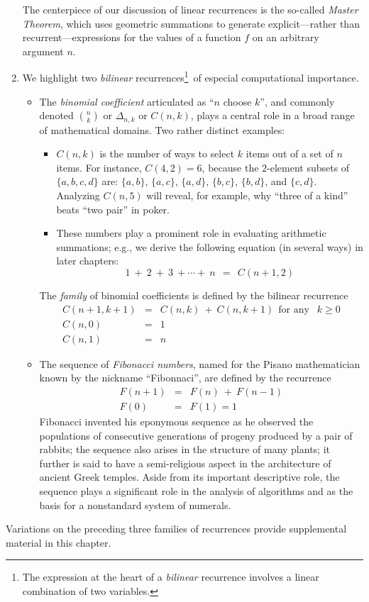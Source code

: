 \begin{enumerate}
\smallskip

The centerpiece of our discussion of linear recurrences is the so-called {\em Master Theorem}, which uses geometric summations to generate explicit---rather than recurrent---expressions for the values of a function $f$ on an arbitrary argument $n$.

\item
We highlight two {\it bilinear} recurrences\footnote{The expression at the heart of a {\it bilinear} recurrence involves a linear combination of two variables.}~of especial computational importance. 
  \begin{itemize} 
  \item
The {\it binomial coefficient} articulated as ``$n$ choose $k$'', and commonly denoted $\displaystyle {n \choose k}$ or $\Delta_{n,k}$ or $C(n,k)$, plays a central role in a broad range of mathematical domains.  Two rather distinct examples:
       \begin{itemize}
       \item
$C(n,k)$ is the number of ways to select $k$ items out of a set of $n$ items.  For instance, $C(4,2) =6$, because the $2$-element subsets of $\{a, b, c, d\}$ are: $\{a, b\}$, $\{a, c\}$, $\{a, d\}$,  $\{b, c\}$, $\{b, d\}$,  and $\{c,d\}$.  Analyzing $C(n, 5)$ will reveal, for example, why ``three of a kind'' beats ``two pair'' in poker.
       \item
These numbers play a prominent role in evaluating arithmetic summations; e.g., we derive the following equation (in several ways) in later chapters:
\[ 1 \ + \ 2 \ + \ 3 \ + \cdots + \ n \ \ = \ \ C(n+1, 2) \]
       \end{itemize}
The {\em family} of binomial coefficients is defined by the bilinear recurrence
\begin{eqnarray*}
C(n+1, k+1) & = & C(n, k) \ + \ C(n, k+1) \ \ \mbox{for any } \ \ k \geq 0 \\
C(n, 0) & = & 1 \\
C(n, 1) & = & n 
\end{eqnarray*}

  \item
The sequence of {\it Fibonacci numbers}, named for the Pisano mathematician known by the nickname ``Fibonnaci'', are defined by the recurrence
\begin{eqnarray*}
F(n+1) & = & F(n) \ + \ F(n-1) \\
F(0) & = & F(1) = 1
\end{eqnarray*}
Fibonacci invented his eponymous sequence as he observed the populations of consecutive generations of progeny produced by a pair of rabbits; the sequence also arises in the structure of many plants; it further is said to have a semi-religious aspect in the architecture
of ancient Greek temples.  Aside from its important descriptive role, the sequence plays a
significant role in the analysis of algorithms and as the basis for a nonstandard system of numerals.
  \end{itemize}
\end{enumerate}
Variations on the preceding three families of recurrences provide supplemental material in this chapter.


